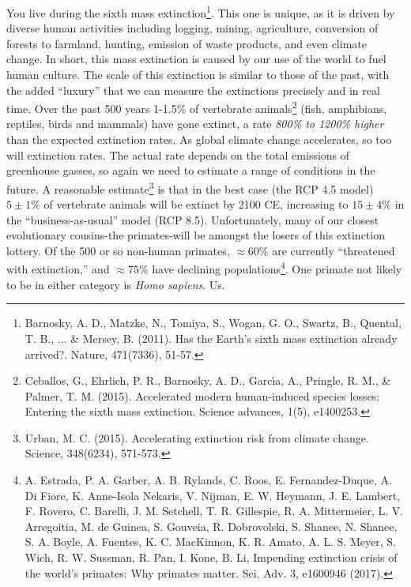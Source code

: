 You live during the sixth mass extinction\footnote{Barnosky, A. D., Matzke, N., Tomiya, S., Wogan, G. O., Swartz, B., Quental, T. B., ... \& Mersey, B. (2011). Has the Earth's sixth mass extinction already arrived?. Nature, 471(7336), 51-57.}. This one is unique, as it is driven by diverse human activities including logging, mining, agriculture, conversion of forests to farmland, hunting, emission of waste products, and even climate change. In short, this mass extinction is caused by our use of the world to fuel human culture. The scale of this extinction is similar to those of the past, with the added ``luxury'' that we can measure the extinctions precisely and in real time. Over the past 500 years 1-1.5\% of vertebrate animals\footnote{Ceballos, G., Ehrlich, P. R., Barnosky, A. D., Garc\'{\i}a, A., Pringle, R. M., \& Palmer, T. M. (2015). Accelerated modern human-induced species losses: Entering the sixth mass extinction. Science advances, 1(5), e1400253.} (fish, amphibians, reptiles, birds and mammals) have gone extinct, a rate \emph{800\% to 1200\% higher} than the expected extinction rates. As global climate change accelerates, so too will extinction rates. The actual rate depends on the total emissions of greenhouse gasses, so again we need to estimate a range of conditions in the future. A reasonable estimate\footnote{Urban, M. C. (2015). Accelerating extinction risk from climate change. Science, 348(6234), 571-573.} is that in the best case (the RCP 4.5 model) $5 \pm 1\%$ of vertebrate animals will be extinct by 2100 CE, increasing to $15 \pm 4\%$ in the ``business-as-usual'' model (RCP 8.5). Unfortunately, many of our closest evolutionary cousins-the primates-will be amongst the losers of this extinction lottery. Of the 500 or so non-human primates, $\approx 60\%$ are currently ``threatened with extinction,'' and $\approx 75\%$ have declining populations\footnote{A. Estrada, P. A. Garber, A. B. Rylands, C. Roos, E. Fernandez-Duque, A. Di Fiore,
K. Anne-Isola Nekaris, V. Nijman, E. W. Heymann, J. E. Lambert, F. Rovero, C. Barelli,
J. M. Setchell, T. R. Gillespie, R. A. Mittermeier, L. V. Arregoitia, M. de Guinea, S. Gouveia,
R. Dobrovolski, S. Shanee, N. Shanee, S. A. Boyle, A. Fuentes, K. C. MacKinnon, K. R. Amato,
A. L. S. Meyer, S. Wich, R. W. Sussman, R. Pan, I. Kone, B. Li, Impending extinction crisis of
the world's primates: Why primates matter. Sci. Adv. 3, e1600946 (2017).}. One primate not likely to be in either category is \textit{Homo sapiens}. Us.\\
  
